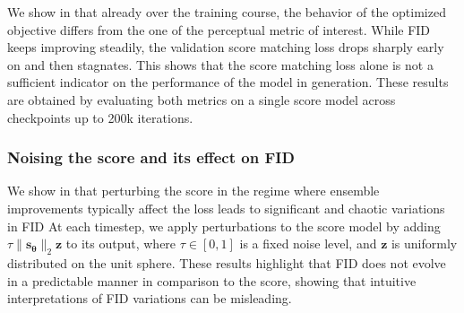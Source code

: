 \documentclass[10pt]{article} %
\def\rvz{{\mathbf{z}}}
\def\vtheta{{\bm{\theta}}}
\def\vs{{\bm{s}}}
\begin{document}
We show in  that already over the training course, the behavior of the optimized objective differs from the one of the perceptual metric of interest. While FID keeps improving steadily, the validation score matching loss drops sharply early on and then stagnates. This shows that the score matching loss alone is not a sufficient indicator on the performance of the model in generation. These results are obtained by evaluating both metrics on a single score model across checkpoints up to 200k iterations.



\subsubsection{Noising the score and its effect on FID} 

We show in  that perturbing the score in the regime where ensemble improvements typically affect the loss leads to significant and chaotic variations in FID At each timestep, we apply perturbations to the score model by adding $\tau \|\vs_\vtheta\|_2 \rvz $ to its output, where $\tau \in [0, 1]$ is a fixed noise level, and $\rvz$ is uniformly distributed on the unit sphere. These results highlight that FID does not evolve in a predictable manner in comparison to the score, showing that intuitive interpretations of FID variations can be misleading.
\end{document}
